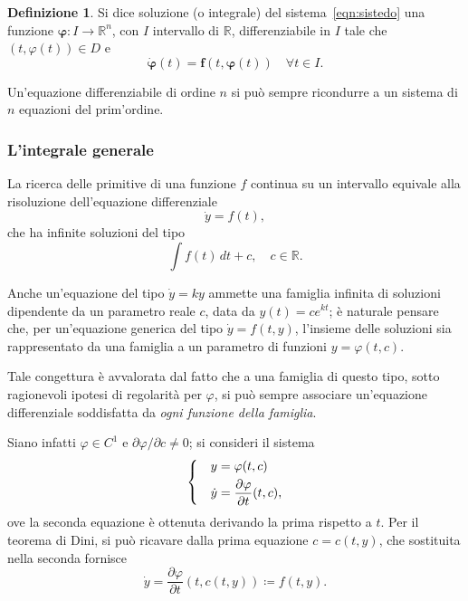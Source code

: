 \documentclass[a4paper]{book}
\numberwithin{equation}{section}
\renewcommand{\phi}{\varphi}
\theoremstyle{plain}
\theoremstyle{definition}
\newtheorem{defn}{Definizione}[section]
\theoremstyle{remark}
\renewcommand{\vec}{\boldsymbol}
\theoremstyle{example}
\begin{document}
	\begin{defn}
		Si dice soluzione (o integrale) del sistema~\eqref{eqn:sistedo} una funzione $\vec{\phi} \colon I \to \mathbb{R}^n$, con $I$ intervallo di $\mathbb{R}$, differenziabile in $I$ tale che $(t, \phi(t)) \in D$ e
			\begin{equation*}
				\dot{\vec{\phi}}(t) = \vec{f}(t, \vec{\phi}(t)) \quad \forall t \in I.
			\end{equation*}
	\end{defn}

	Un'equazione differenziabile di ordine $n$ si può sempre ricondurre a un sistema di $n$ equazioni del prim'ordine.

	\subsubsection*{L'integrale generale}
	La ricerca delle primitive di una funzione $f$ continua su un intervallo equivale alla risoluzione dell'equazione differenziale
		\begin{equation*}
			\dot{y} = f(t),
		\end{equation*}
	che ha infinite soluzioni del tipo
		\begin{equation*}
			\int f(t) \, dt + c, \quad c \in \mathbb{R}.
		\end{equation*}

Anche un'equazione del tipo $\dot{y} = ky$ ammette una famiglia infinita di soluzioni dipendente da un parametro reale $c$, data da $y(t) = ce^{kt}$; è naturale pensare che, per un'equazione generica del tipo $\dot{y} = f(t,y)$, l'insieme delle soluzioni sia rappresentato da una famiglia a un parametro di funzioni $y = \phi (t, c)$.

Tale congettura è avvalorata dal fatto che a una famiglia di questo tipo, sotto ragionevoli ipotesi di regolarità per $\phi$, si può sempre associare un'equazione differenziale soddisfatta da \emph{ogni funzione della famiglia}.

Siano infatti $\phi \in C^1$ e $\partial \phi / \partial c \ne 0$; si consideri il sistema
\begin{equation*}
	\begin{dcases}
		&y = \phi(t,c) \\
		&\dot{y} = \frac{\partial \phi}{\partial t}(t, c),
	\end{dcases}
\end{equation*}
ove la seconda equazione è ottenuta derivando la prima rispetto a $t$. Per il teorema di Dini, si può ricavare dalla prima equazione $c = c(t, y)$, che sostituita nella seconda fornisce
	\begin{equation*}
		\dot{y} = \frac{\partial \phi}{\partial t}(t, c(t, y)) \coloneqq f(t, y).
	\end{equation*}
\end{document}

